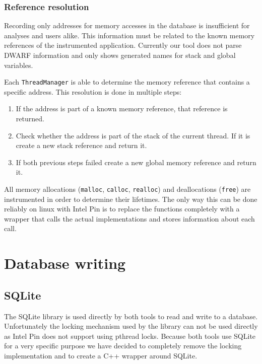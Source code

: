 \subsubsection{Reference resolution}

Recording only addresses for memory accesses in the database is insufficient for analyses and users alike. This information must be related to the known memory references of the instrumented application. Currently our tool does not parse DWARF information and only shows generated names for stack and global variables.

Each \texttt{ThreadManager} is able to determine the memory reference that contains a specific address. This resolution is done in multiple steps:

\begin{enumerate}
	\item If the address is part of a known memory reference, that reference is returned.
	\item Check whether the address is part of the stack of the current thread. If it is create a new stack reference and return it.
	\item If both previous steps failed create a new global memory reference and return it.
\end{enumerate}

All memory allocations (\texttt{malloc}, \texttt{calloc}, \texttt{realloc}) and deallocations (\texttt{free}) are instrumented in order to determine their lifetimes. The only way this can be done reliably on linux with Intel Pin is to replace the functions completely with a wrapper that calls the actual implementations and stores information about each call.

\section{Database writing}

\subsection{SQLite}

The SQLite library \cite{sqlitedoc} is used directly by both tools to read and write to a database. Unfortunately the locking mechanism used by the library can not be used directly as Intel Pin does not support using pthread locks. Because both tools use SQLite for a very specific purpose  we have decided to completely remove the locking implementation and to create a C++ wrapper around SQLite.

